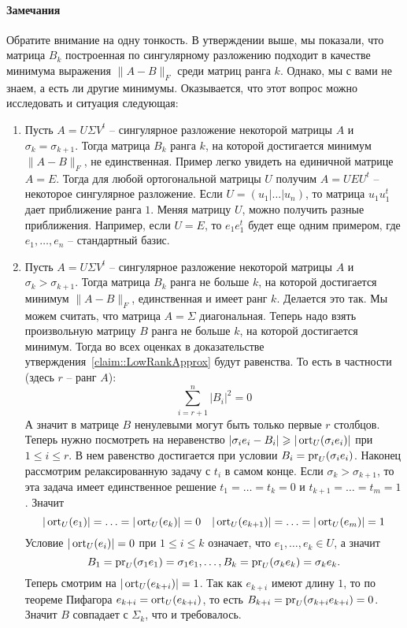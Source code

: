 \paragraph{Замечания}

Обратите внимание на одну тонкость.
 В утверждении выше, мы показали, что матрица $B_k$ построенная по сингулярному разложению подходит в качестве минимума выражения $\|A - B\|_F$ среди матриц ранга $k$.
 Однако, мы с вами не знаем, а есть ли другие минимумы.
 Оказывается, что этот вопрос можно исследовать и ситуация следующая:
\begin{enumerate}
\item Пусть $A = U \Sigma V^t$ -- сингулярное разложение некоторой матрицы $A$ и $\sigma_k = \sigma_{k+1}$.
Тогда матрица $B_k$ ранга $k$, на которой достигается минимум $\|A - B\|_F$, не единственная.
Пример легко увидеть на единичной матрице $A = E$.
Тогда для любой ортогональной матрицы $U$ получим $A = U E U^t$ -- некоторое сингулярное разложение.
Если $U = (u_1|\ldots|u_n)$, то матрица
$u_1 u_1^t$ дает приближение ранга $1$.
Меняя матрицу $U$, можно получить разные приближения.
Например, если $U = E$, то $e_1e_1^t$ будет еще одним примером, где $e_1,\ldots,e_n$ -- стандартный базис.

\item Пусть $A = U \Sigma V^t$ -- сингулярное разложение некоторой матрицы $A$ и $\sigma_k > \sigma_{k+1}$.
Тогда матрица $B_k$ ранга не больше $k$, на которой достигается минимум $\|A - B\|_F$, единственная и имеет ранг $k$.
Делается это так.
Мы можем считать, что матрица $A = \Sigma$ диагональная.
Теперь надо взять произвольную матрицу $B$ ранга не больше $k$, на которой достигается минимум.
Тогда во всех оценках в доказательстве утверждения~\ref{claim::LowRankApprox} будут равенства.
То есть в частности (здесь $r$ -- ранг $A$):
\[
\sum_{i=r+1}^n |B_i|^2 = 0
\]
А значит в матрице $B$ ненулевыми могут быть только первые $r$ столбцов.
Теперь нужно посмотреть на неравенство $|\sigma_i e_i - B_i| \geqslant |\operatorname{ort}_U(\sigma_i e_i)|$ при $1\leqslant i \leqslant r$.
В нем равенство достигается при условии $B_i = \operatorname{pr}_U(\sigma_i e_i)$.
Наконец рассмотрим релаксированную задачу с $t_i$ в самом конце.
Если $\sigma_k > \sigma_{k+1}$, то эта задача имеет единственное решение $t_1 = \ldots = t_k = 0$ и $t_{k+1} = \ldots = t_m = 1$.
Значит
\[
|\operatorname{ort}_U(e_1)| = \ldots = |\operatorname{ort}_U(e_k)| = 0 \quad
|\operatorname{ort}_U(e_{k+1})| = \ldots = |\operatorname{ort}_U(e_m)| = 1
\]
Условие $|\operatorname{ort}_U(e_i)| = 0$ при $1 \leqslant i \leqslant k$ означает, что $e_1,\ldots,e_k \in U$, а значит
\[
B_1 = \operatorname{pr}_U(\sigma_1 e_1) = \sigma_1 e_1,\ldots, B_k = \operatorname{pr}_U(\sigma_k e_k) =\sigma_k e_k.
\]
Теперь смотрим на $|\operatorname{ort}_U(e_{k+i})| = 1$.
Так как $e_{k+i}$ имеют длину $1$, то по теореме Пифагора $e_{k+i} = \operatorname{ort}_U(e_{k+i})$, то есть $B_{k+i} = \operatorname{pr}_U(\sigma_{k+i} e_{k+i}) = 0$.
Значит $B$ совпадает с $\Sigma_k$, что и требовалось.
\end{enumerate}

